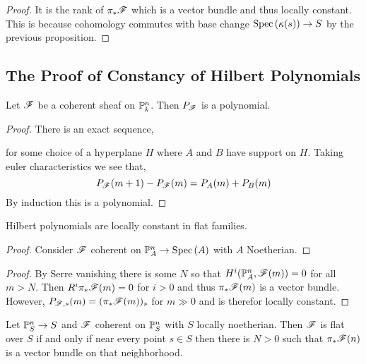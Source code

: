 \documentclass[12pt]{article}
\begin{document}
\begin{proof}
It is the rank of $\pi_* \F$ which is a vector bundle and thus locally constant. This is because cohomology commutes with base change $\Spec{\kappa(s)} \to S$ by the previous proposition.
\end{proof}

\subsection{The Proof of Constancy of Hilbert Polynomials}

\begin{prop}
Let $\F$ be a coherent sheaf on $\P^n_k$. Then $P_\F$ is a polynomial.
\end{prop}

\begin{proof}
There is an exact sequence,
\begin{center}
\end{center}
for some choice of a hyperplane $H$ where $A$ and $B$ have support on $H$. Taking euler characteristics we see that,
\[ P_\F(m+1) - P_\F(m) = P_A(m) + P_B(m) \]
By induction this is a polynomial.
\end{proof}

\begin{thm}
Hilbert polynomials are locally constant in flat families.
\end{thm}

\begin{proof}
Consider $\F$ coherent on $\P^n_A \to \Spec{A}$ with $A$ Noetherian. 
\end{proof}

\begin{proof}
By Serre vanishing there is some $N$ so that $H^i(\P^n_A, \F(m)) = 0$ for all $m > N$. Then $R^i \pi_* \F(m) = 0$ for $i > 0$ and thus $\pi_* \F(m)$ is a vector bundle. However, $P_{\F,s}(m) = (\pi_* \F(m))_s$ for $m \gg 0$ and is therefor locally constant. 
\end{proof}

\begin{thm}
Let $\P^n_S \to S$ and $\F$ coherent on $\P^n_S$ with $S$ locally noetherian. Then $\F$ is flat over $S$ if and only if near every point $s \in S$ then there is $N > 0$ such that $\pi_* \F(n)$ is a vector bundle on that neighborhood. 
\end{thm}
\end{document}
